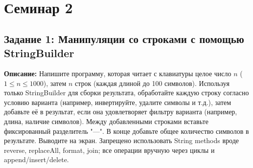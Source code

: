 \documentclass[12pt]{article}
\begin{document}
\section{Семинар 2}

\subsection{Задание 1: Манипуляции со строками с помощью StringBuilder}
  \textbf{Описание:} Напишите программу, которая читает с клавиатуры целое число $n$ ($1 \leq n \leq 1000$), затем $n$ строк (каждая длиной до 100 символов). Используя только StringBuilder для сборки результата, обработайте каждую строку согласно условию варианта (например, инвертируйте, удалите символы и т.д.), затем добавьте её в результат, если она удовлетворяет фильтру варианта (например, длина, наличие символов). Между добавленными строками вставьте фиксированный разделитель "---". В конце добавьте общее количество символов в результате. Выводите на экран. Запрещено использовать String methods вроде reverse, replaceAll, format, join; все операции вручную через циклы и append/insert/delete.
\end{document}
